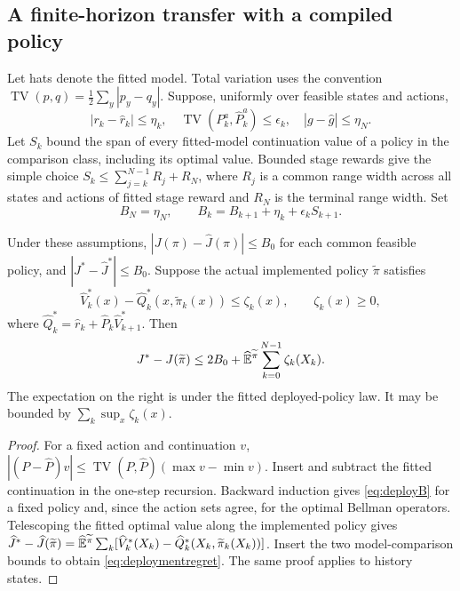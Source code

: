 \subsection{A finite-horizon transfer with a compiled policy}

Let hats denote the fitted model. Total variation uses the convention
$\operatorname{TV}(p,q)=\tfrac12\sum_y|p_y-q_y|$.
Suppose, uniformly over feasible states and actions,
\[
 |r_k-\widehat r_k|\le\eta_k,\quad
 \operatorname{TV}(P_k^a,\widehat P_k^a)\le\epsilon_k,
 \quad |g-\widehat g|\le\eta_N.
\]
Let $S_k$ bound the span of every fitted-model continuation value of a
policy in the comparison class, including its optimal value. Bounded
stage rewards give the simple choice
$S_k\le\sum_{j=k}^{N-1}R_j+R_N$, where $R_j$ is a common range width
across all states and actions of fitted stage reward and $R_N$ is the
terminal range width. Set
\begin{equation}\label{eq:deployB}
 B_N=\eta_N,\qquad
 B_k=B_{k+1}+\eta_k+\epsilon_k S_{k+1}.
\end{equation}

\begin{theorem}
\label{thm:deploymenttransfer}
Under these assumptions, $|J(\pi)-\widehat J(\pi)|\le B_0$ for each
common feasible policy, and $|J^*-\widehat J^*|\le B_0$.
Suppose the actual implemented policy $\widetilde\pi$ satisfies
\[
 \widehat V_k^*(x)-\widehat Q_k^*(x,\widetilde\pi_k(x))
 \le\zeta_k(x),\qquad \zeta_k(x)\ge0,
\]
where $\widehat Q_k^*=\widehat r_k+\widehat P_k\widehat V_{k+1}^*$.
Then
\begin{equation}\label{eq:deploymentregret}
 J^*-J(\widetilde\pi)
 \le 2B_0+
 \widehat{\mathbb{E}}^{\widetilde\pi}\sum_{k=0}^{N-1}\zeta_k(X_k).
\end{equation}
The expectation on the right is under the fitted deployed-policy law.
It may be bounded by $\sum_k\sup_x\zeta_k(x)$.
\end{theorem}
\begin{proof}
For a fixed action and continuation $v$,
$|(P-\widehat P)v|\le\operatorname{TV}(P,\widehat P)
(\max v-\min v)$. Insert and subtract the fitted continuation in the
one-step recursion. Backward induction gives \eqref{eq:deployB} for a
fixed policy and, since the action sets agree, for the optimal Bellman
operators. Telescoping the fitted optimal value along the implemented
policy gives
$\widehat J^*-\widehat J(\widetilde\pi)
=\widehat{\mathbb{E}}^{\widetilde\pi}\sum_k
[\widehat V_k^*(X_k)-\widehat Q_k^*(X_k,\widetilde\pi_k(X_k))]$.
Insert the two model-comparison bounds to obtain
\eqref{eq:deploymentregret}. The same proof applies to history states.
\end{proof}

